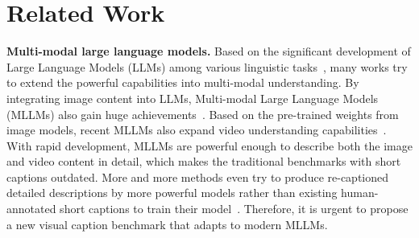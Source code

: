 \section{Related Work}
\noindent\textbf{Multi-modal large language models.}
Based on the significant development of Large Language Models (LLMs) among various linguistic tasks~\cite{gpt3, vicuna, qwen2.5, llama3}, many works try to extend the powerful capabilities into multi-modal understanding. By integrating image content into LLMs, Multi-modal Large Language Models (MLLMs) also gain huge achievements~\cite{llava, llava1.5, qwenvl, minigpt4, llavanext, internvl, gpt4v}. Based on the pre-trained weights from image models, recent MLLMs also expand video understanding capabilities~\cite{llavanextvideo, llavaov, llavavideo, qwen2vl, internvl2.5, nvila, videollama3, qwen2.5vl}. With rapid development, MLLMs are powerful enough to describe both the image and video content in detail, which makes the traditional benchmarks with short captions outdated. More and more methods even try to produce re-captioned detailed descriptions by more powerful models rather than existing human-annotated short captions to train their model~\cite{llavaov, videollama3}. Therefore, it is urgent to propose a new visual caption benchmark that adapts to modern MLLMs.

